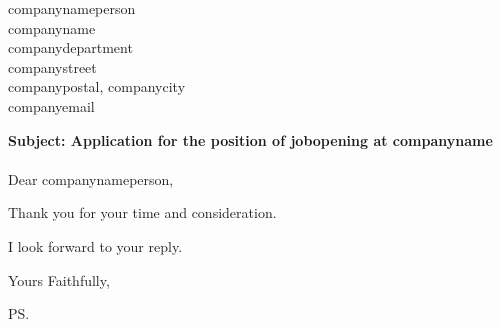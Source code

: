 \documentclass{letter}
\newcommand{\letterdate}{letterdate}
\newcommand{\jobopening}{jobopening}
\newcommand{\companynameperson}{companynameperson}
\newcommand{\companyname}{companyname}
\newcommand{\companydepartment}{companydepartment}
\newcommand{\companystreet}{companystreet}
\newcommand{\companypostal}{companypostal}
\newcommand{\companycity}{companycity}
\newcommand{\companyemail}{companyemail}
\begin{document}
\begin{letter}{\companynameperson \\ \companyname \\ \companydepartment \\ \companystreet \\ \companypostal, \companycity \\ \companyemail}

	
	\opening{
		{\bf Subject: Application for the position of {\jobopening} at \companyname} \\ ~ \\
	          Dear \companynameperson,
	}

	

	Thank you for your time and consideration.

	I look forward to your reply.

	\closing{Yours Faithfully,}

	\ps


\end{letter}
\end{document}

